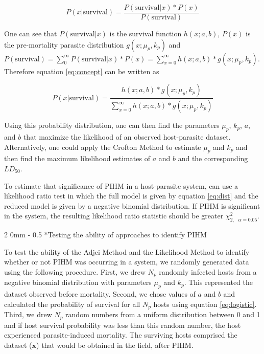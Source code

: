 \documentclass[12pt, a4paper]{article}
\makeatletter
\renewcommand{\subsection}{\@startsection
{subsection}%
{2}%
{0mm}%
{-\baselineskip}%
{0.5\baselineskip}%
{\normalfont\bf}} %
\makeatother
\begin{document}
\begin{equation}
    P(x | \text{survival}) = \dfrac{P(\text{survival} | x) * P(x)}{P(\text{survival})}
    \label{eq:concept}
\end{equation}

One can see that $P(\text{survival} | x)$ is the survival function $h(x; a, b)$, $P(x)$ is the pre-mortality parasite distribution $g(x; \mu_p, k_p)$ and $P(\text{survival}) = \sum_0^{\infty} P(\text{survival} | x) * P(x) =  \sum_{x=0}^{\infty} h(x; a, b)  * g(x; \mu_p, k_p)$. Therefore equation \ref{eq:concept} can be written as

\begin{equation}
    P(x | \text{survival}) = \dfrac{h(x; a, b)  * g(x; \mu_p, k_p)}{\sum_{x=0}^{\infty} h(x; a, b)  * g(x; \mu_p, k_p)}
    \label{eq:dist}
\end{equation}

Using this probability distribution, one can then find the parameters $\mu_p$, $k_p$, $a$, and $b$ that maximize the likelihood of an observed host-parasite dataset. Alternatively, one could apply the Crofton Method to estimate $\mu_p$ and $k_p$ and then find the maximum likelihood estimates of $a$ and $b$ and the corresponding $LD_{50}$.

To estimate that significance of PIHM in a host-parasite system, can use a
likelihood ratio test in which the full model is given by equation
\ref{eq:dist} and the reduced model is given by a negative binomial
distribution.  If PIHM is significant in the system, the resulting likelihood
ratio statistic should be greater $\chi^2_{2,\text{ } \alpha=0.05}$.

\subsection*{Testing the ability of approaches to identify PIHM}

To test the ability of the Adjei Method and the Likelihood Method to identify whether or not PIHM was occurring in a system, we randomly generated data using the following procedure.  First, we drew $N_p$ randomly infected hosts from a
negative binomial distribution with parameters $\mu_p$ and $k_p$.  This represented the dataset observed before mortality. Second, we chose values of $a$ and $b$ and calculated the probability of survival
for all $N_p$ hosts using equation \ref{eq:logistic}.  Third, we drew $N_p$ random numbers from a uniform distribution
between 0 and 1 and if host survival probability was less than this random
number, the host experienced parasite-induced mortality.  The surviving
hosts comprised the dataset ($\mathbf{x}$) that would be obtained in the field, after PIHM.
\end{document}

